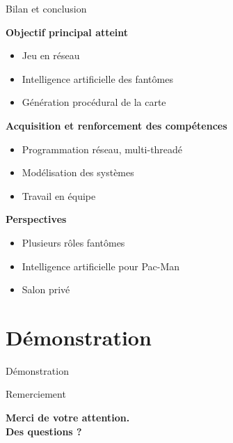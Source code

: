 \documentclass{beamer}
\begin{document}
\begin{frame}{Bilan et conclusion}

    \textbf{Objectif principal atteint}
    \begin{itemize}
        \item Jeu en réseau
        \item Intelligence artificielle des fantômes
        \item Génération procédural de la carte
    \end{itemize}
    \textbf{Acquisition et renforcement des compétences}
    \begin{itemize}
        \item Programmation réseau, multi-threadé
        \item Modélisation des systèmes
        \item Travail en équipe
    \end{itemize}
    \textbf{Perspectives}
    \begin{itemize}
        \item Plusieurs rôles fantômes
        \item Intelligence artificielle pour Pac-Man
        \item Salon privé
    \end{itemize}

    
\end{frame}

\section{Démonstration}

\begin{frame}{Démonstration}
\end{frame}

\begin{frame}{Remerciement}
    \begin{center}
    \huge{\textbf{Merci de votre attention.\\
    Des questions ?}}
    \end{center}
    
\end{frame}
\end{document}
